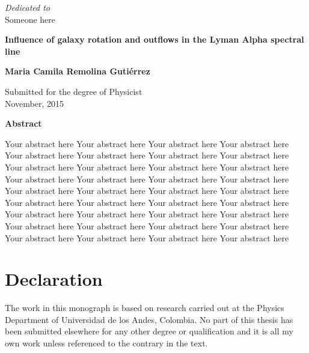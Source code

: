 \newpage
\thispagestyle{empty}
\begin{center}
\vspace*{2cm}
\textit{\LARGE {Dedicated to}}\\ 
Someone here

\end{center}


\newpage
\thispagestyle{empty}
\begin{center}
  \textbf{\Large Influence of galaxy rotation and outflows in the Lyman Alpha spectral line}

  \vspace*{1cm}
  \textbf{\large Maria Camila Remolina Guti\'errez}

  \vspace*{0.5cm}
  {\large Submitted for the degree of Physicist\\ November, 2015}

  \vspace*{1cm}
  \textbf{\large Abstract}
\end{center}
Your abstract here Your abstract here Your abstract here Your abstract here
Your abstract here Your abstract here Your abstract here Your abstract here
Your abstract here Your abstract here Your abstract here Your abstract here
Your abstract here Your abstract here Your abstract here Your abstract here
Your abstract here Your abstract here Your abstract here Your abstract here
Your abstract here Your abstract here Your abstract here Your abstract here
Your abstract here Your abstract here Your abstract here Your abstract here
Your abstract here Your abstract here Your abstract here Your abstract here
Your abstract here Your abstract here Your abstract here Your abstract here

\chapter*{Declaration}
The work in this monograph is based on research carried out at the Physics Department of Universidad de los Andes, Colombia. No part of this thesis has been submitted elsewhere for any other degree or qualification and it is all my own work unless referenced to the contrary in the text. 


